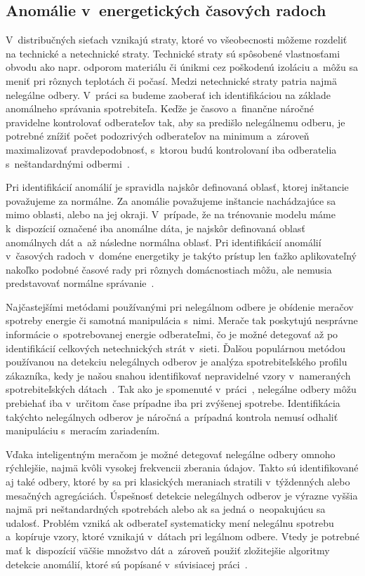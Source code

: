 \documentclass[a4paper,twoside,slovak,12pt,appendix]{article}
\begin{document}
\subsection{Anomálie v~energetických časových radoch}
V~distribučných sieťach vznikajú straty, ktoré vo všeobecnosti môžeme rozdeliť
na technické a netechnické straty. Technické straty sú spôsobené vlastnosťami
obvodu ako napr. odporom materiálu či únikmi cez poškodenú izoláciu a~môžu sa
meniť pri rôznych teplotách či počasí. Medzi netechnické straty patria najmä
nelegálne odbery. V~práci sa budeme zaoberať ich identifikáciou na základe
anomálneho správania spotrebiteľa. Keďže je časovo a~finančne náročné
pravidelne kontrolovať odberateľov tak, aby sa predišlo nelegálnemu odberu,
je potrebné znížiť počet podozrivých odberateľov na minimum a~zároveň
maximalizovať pravdepodobnosť, s~ktorou budú kontrolovaní iba odberatelia
s~neštandardnými odbermi~\cite{Coma-Puig2016,Sahoo2015}.

Pri identifikácií anomálií je spravidla najskôr definovaná oblasť, ktorej
inštancie považujeme za normálne. Za anomálie považujeme inštancie nachádzajúce
sa mimo oblasti, alebo na jej okraji. V~prípade, že na trénovanie modelu máme
k~dispozícií označené iba anomálne dáta, je najskôr definovaná oblasť anomálnych
dát a~až následne normálna oblasť. Pri identifikácií anomálií v~časových radoch
v~doméne energetiky je takýto prístup len ťažko aplikovateľný nakoľko podobné
časové rady pri rôznych domácnostiach môžu, ale nemusia predstavovať normálne
správanie~\cite{Spiric2015}.

Najčastejšími metódami používanými pri nelegálnom odbere je obídenie meračov
spotreby energie či samotná manipulácia s~nimi. Merače tak poskytujú nesprávne
informácie o~spotrebovanej energie odberateľmi, čo je možné detegovať až po
identifikácií celkových netechnických strát v~sieti. Ďalšou populárnou metódou
používanou na detekciu nelegálnych odberov je analýza spotrebiteľského
profilu zákazníka, kedy je našou snahou identifikovať nepravidelné vzory
v~nameraných spotrebiteľských dátach~\cite{Sahoo2015}. Tak ako je spomenuté
v~práci~\cite{Depuru2012}, nelegálne odbery môžu prebiehať iba v~určitom čase
prípadne iba pri zvýšenej spotrebe. Identifikácia takýchto nelegálnych odberov
je náročná a~prípadná kontrola nemusí odhaliť manipuláciu s~meracím zariadením.

Vďaka inteligentným meračom je možné detegovať nelegálne odbery omnoho
rýchlejšie, najmä kvôli vysokej frekvencii zberania údajov. Takto sú
identifikované aj také odbery, ktoré by sa pri klasických meraniach stratili
v~týždenných alebo mesačných agregáciách. Úspešnosť detekcie nelegálnych odberov
je výrazne vyššia najmä pri neštandardných spotrebách alebo ak sa jedná
o~neopakujúcu sa udalosť. Problém vzniká ak odberateľ systematicky mení
nelegálnu spotrebu a~kopíruje vzory, ktoré vznikajú v~dátach pri legálnom
odbere. Vtedy je potrebné mať k~dispozícií väčšie množstvo dát a~zároveň použiť
zložitejšie algoritmy detekcie anomálií, ktoré sú popísané v~súvisiacej
práci~\cite{Nikovski2013}.
\end{document}
